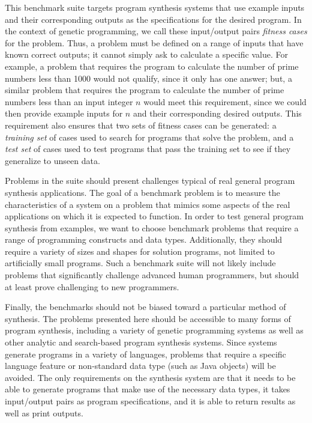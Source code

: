 \documentclass{sig-alternate}
\begin{document}
This benchmark suite targets program synthesis systems that use example inputs and their corresponding outputs as the specifications for the desired program. In the context of genetic programming, we call these input/output pairs \textit{fitness cases} for the problem. Thus, a problem must be defined on a range of inputs that have known correct outputs; it cannot simply ask to calculate a specific value. For example, a problem that requires the program to calculate the number of prime numbers less than 1000 would not qualify, since it only has one answer; but, a similar problem that requires the program to calculate the number of prime numbers less than an input integer $n$ would meet this requirement, since we could then provide example inputs for $n$ and their corresponding desired outputs. This requirement also ensures that two sets of fitness cases can be generated: a \textit{training set} of cases used to search for programs that solve the problem, and a \textit{test set} of cases used to test programs that pass the training set to see if they generalize to unseen data.

Problems in the suite should present challenges typical of real general program synthesis applications. The goal of a benchmark problem is to measure the characteristics of a system on a problem that mimics some aspects of the real applications on which it is expected to function. In order to test general program synthesis from examples, we want to choose benchmark problems that require a range of programming constructs and data types. Additionally, they should require a variety of sizes and shapes for solution programs, not limited to artificially small programs. Such a benchmark suite will not likely include problems that significantly challenge advanced human programmers, but should at least prove challenging to new programmers.

Finally, the benchmarks should not be biased toward a particular method of synthesis. The problems presented here should be accessible to many forms of program synthesis, including a variety of genetic programming systems as well as other analytic and search-based program synthesis systems. Since systems generate programs in a variety of languages, problems that require a specific language feature or non-standard data type (such as Java objects) will be avoided. The only requirements on the synthesis system are that it needs to be able to generate programs that make use of the necessary data types, it takes input/output pairs as program specifications, and it is able to return results as well as print outputs.
\end{document}
